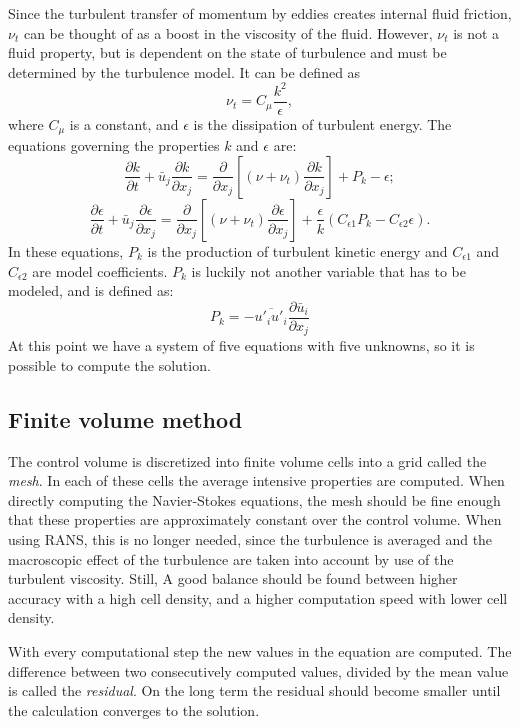 Since the turbulent transfer of momentum by eddies creates internal fluid friction, $\nu_t$ can be thought of as a boost in the viscosity of the fluid. However, $\nu_t$ is not a fluid property, but is dependent on the state of turbulence and must be determined by the turbulence model. It can be defined as 
\begin{equation}\label{eq:NU}
\nu_t = C_\mu\frac{k^2}{\epsilon},
\end{equation}
where $C_\mu$ is a constant, and $\epsilon$ is the dissipation of turbulent energy. The equations governing the properties $k$ and $\epsilon$ are:
\begin{equation}\label{eq:ke1}
\frac{\partial k}{\partial t} + \bar{u}_j\frac{\partial k}{\partial x_j} = \frac{\partial}{\partial x_j} \left[(\nu + \nu_t) \frac{\partial k }{\partial x_j}\right] + P_k - \epsilon;
\end{equation}
\begin{equation}\label{eq:ke2}
\frac{\partial \epsilon}{\partial t} + \bar{u}_j\frac{\partial \epsilon}{\partial x_j} = \frac{\partial}{\partial x_j} \left[(\nu + \nu_t) \frac{\partial \epsilon}{\partial x_j}\right] + \frac{\epsilon}{k}(C_{\epsilon 1}P_k - C_{\epsilon 2}\epsilon).
\end{equation}
In these equations, $P_k$ is the production of turbulent kinetic energy and $C_{\epsilon 1}$ and $C_{\epsilon 2}$ are model coefficients. $P_k$ is luckily not another variable that has to be modeled, and is defined as:
\begin{equation}\label{eq:P}
P_k=-\overline{u'_iu'_i}\frac{\partial \bar{u}_i}{\partial x_j}
\end{equation}
At this point we have a system of five equations with five unknowns, so it is possible to compute the solution.

\subsection{Finite volume method}

The control volume is discretized into finite volume cells into a grid called the \emph{mesh}. In each of these cells the average intensive properties are computed. When directly computing the Navier-Stokes equations, the mesh should be fine enough that these properties are approximately constant over the control volume. When using RANS, this is no longer needed, since the turbulence is averaged and the macroscopic effect of the turbulence are taken into account by use of the turbulent viscosity. Still, A good balance should be found between higher accuracy with a high cell density, and a higher computation speed with lower cell density. 

With every computational step the new values in the equation are computed. The difference between two consecutively computed values, divided by the mean value is called the \emph{residual}. On the long term the residual should become smaller until the calculation converges to the solution. 